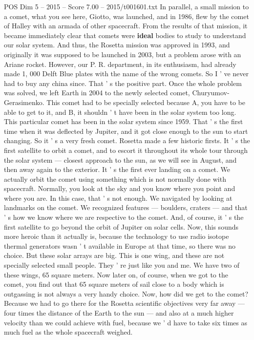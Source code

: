 \begin{textsample}{POS Dim 5 – 2015 – Score 7.00 – 2015/t001601.txt}
In parallel, a small mission to a comet, what you see here, Giotto, was launched, and in 1986, flew by the comet of Halley with an armada of other spacecraft.
From the results of that mission, it became immediately clear that comets were \textbf{ideal} bodies to study to understand our solar system.
And thus, the Rosetta mission was approved in 1993, and originally it was supposed to be launched in 2003, but a problem arose with an Ariane rocket.
However, our P.
R. department, in its enthusiasm, had already made 1, 000 Delft Blue plates with the name of the wrong comets.
So I ' ve never had to buy any china since.
That ' s the positive part.
Once the whole problem was solved, we left Earth in 2004 to the newly selected comet, Churyumov-Gerasimenko.
This comet had to be specially selected because A, you have to be able to get to it, and B, it shouldn ' t have been in the solar system too long.
This particular comet has been in the solar system since 1959.
That ' s the first time when it was deflected by Jupiter, and it got close enough to the sun to start changing.
So it ' s a very fresh comet.
Rosetta made a few historic firsts.
It ' s the first satellite to orbit a comet, and to escort it throughout its whole tour through the solar system — closest approach to the sun, as we will see in August, and then away again to the exterior.
It ' s the first ever landing on a comet.
We actually orbit the comet using something which is not normally done with spacecraft.
Normally, you look at the sky and you know where you point and where you are.
In this case, that ' s not enough.
We navigated by looking at landmarks on the comet.
We recognized features — boulders, craters — and that ' s how we know where we are respective to the comet.
And, of course, it ' s the first satellite to go beyond the orbit of Jupiter on solar cells.
Now, this sounds more heroic than it actually is, because the technology to use radio isotope thermal generators wasn ' t available in Europe at that time, so there was no choice.
But these solar arrays are big.
This is one wing, and these are not specially selected small people.
They ' re just like you and me.
We have two of these wings, 65 square meters.
Now later on, of course, when we got to the comet, you find out that 65 square meters of sail close to a body which is outgassing is not always a very handy choice.
Now, how did we get to the comet?
Because we had to go there for the Rosetta scientific objectives very far away — four times the distance of the Earth to the sun — and also at a much higher velocity than we could achieve with fuel, because we ' d have to take six times as much fuel as the whole spacecraft weighed.

\end{textsample}
